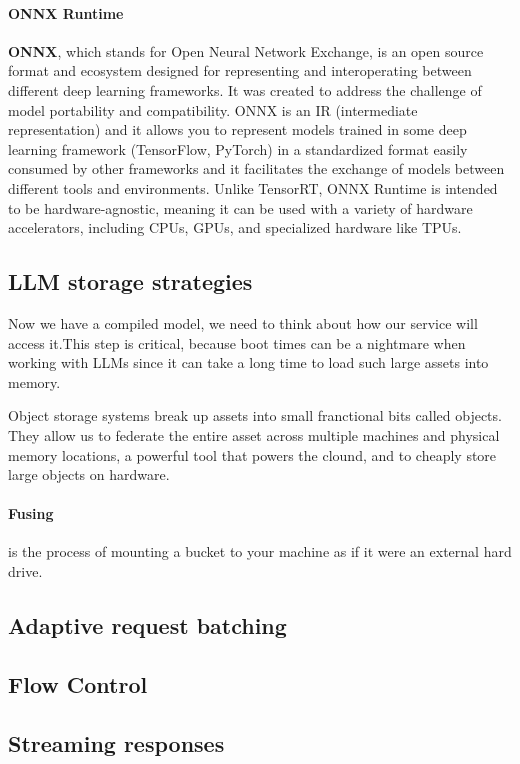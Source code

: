 \paragraph{ONNX Runtime}

\textbf{ONNX}, which stands for Open Neural Network Exchange, is an open source format and ecosystem designed for representing and interoperating between different deep learning frameworks. It was created to address the challenge of model portability and compatibility. ONNX is an IR (intermediate representation) and it allows you to represent models trained in some deep learning framework (\eg TensorFlow, PyTorch) in a standardized format easily consumed by other frameworks and it facilitates the exchange of models between different tools and environments. Unlike TensorRT, ONNX Runtime is intended to be hardware-agnostic, meaning it can be used with a variety of hardware accelerators, including CPUs, GPUs, and specialized hardware like TPUs. 

\subsection{LLM storage strategies}

Now we have a compiled model, we need to think about how our service will access it.This step is critical, because boot times can be a nightmare when working with LLMs since it can take a long time to load such large assets into memory.  

Object storage systems break up assets into small franctional bits called objects. They allow us to federate the entire asset across multiple machines and physical memory locations, a powerful tool that powers the clound, and to cheaply store large objects on hardware.  

\paragraph{Fusing} is the process of mounting a bucket to your machine as if it were an external hard drive. 

\subsection{Adaptive request batching}
\subsection{Flow Control}
\subsection{Streaming responses}
